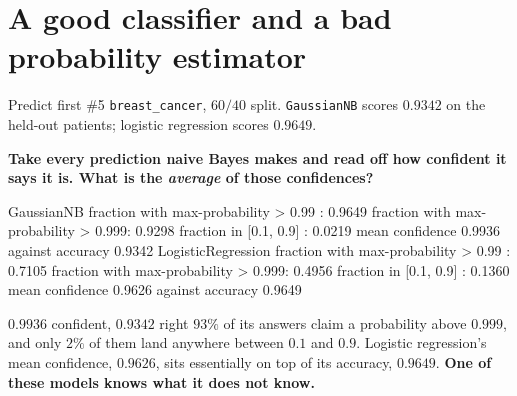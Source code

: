 \documentclass[aspectratio=169]{beamer}
\begin{document}
\section[Bad probabilities]{A good classifier and a bad probability
estimator}
\label{sec:calib}

\begin{frame}[fragile,shrink=7]{Predict first \#5}
\texttt{breast\_cancer}, $60/40$ split. \texttt{GaussianNB} scores $0.9342$
on the held-out patients; logistic regression scores $0.9649$.

\begin{center}
  \textbf{Take every prediction naive Bayes makes and read off how confident
  it says it is. What is the \emph{average} of those confidences?}
\end{center}
\vspace{0.2em}
\begin{outblk}
   GaussianNB           fraction with max-probability > 0.99 : 0.9649
                        fraction with max-probability > 0.999: 0.9298
                        fraction in [0.1, 0.9]              : 0.0219
                        mean confidence 0.9936 against accuracy 0.9342
   LogisticRegression   fraction with max-probability > 0.99 : 0.7105
                        fraction with max-probability > 0.999: 0.4956
                        fraction in [0.1, 0.9]              : 0.1360
                        mean confidence 0.9626 against accuracy 0.9649
\end{outblk}
\begin{alertblock}{$\mathbf{0.9936}$ confident, $\mathbf{0.9342}$ right}
  \footnotesize $93\%$ of its answers claim a probability above
  \textbf{$0.999$}, and only $2\%$ of them land anywhere between $0.1$ and
  $0.9$. Logistic regression's mean confidence, $0.9626$, sits essentially on
  top of its accuracy, $0.9649$. \textbf{One of these models knows what it
  does not know.}
\end{alertblock}
\end{frame}
\end{document}
